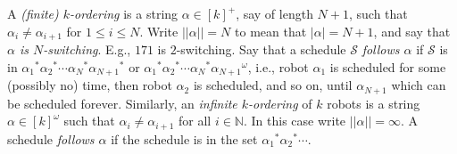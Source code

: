 \documentclass{llncs}
\newcommand{\head}[1]{\vspace{2mm} \noindent  {\bf #1}}
\def\nat{\mathbb{N}}
\def\ins{\textsc{ins}}
\newcommand{\sr}[1]{\footnote{{\color{red} Note. #1}}}
\renewcommand{\sr}[1]{}
\begin{document}

\head{Orderings.} A {\em (finite) $k$-ordering} is a string $\alpha \in [k]^+$, say of length $N+1$, such that $\alpha_i \neq \alpha_{i+1}$ for $1 \leq i \leq N$. Write $||\alpha|| = N$ to mean that $|\alpha| = N+1$, and say that {\em $\alpha$ is $N$-switching}. E.g., $171$ is $2$-switching.
%
Say that a schedule $\mathcal{S}$ {\em follows $\alpha$} if $\mathcal{S}$ is in ${\alpha_1}^* {\alpha_{2}}^* \cdots {\alpha_N}^*{\alpha_{N+1}}^*$ or $ {\alpha_1}^* {\alpha_{2}}^* \cdots {\alpha_N}^*{\alpha_{N+1}}^\omega$, i.e., robot $\alpha_1$ is scheduled for some (possibly no) time, then robot $\alpha_{2}$ is scheduled, and so on, until $\alpha_{N+1}$ which can be scheduled forever.
%
Similarly, an {\em infinite $k$-ordering} of $k$ robots is a string $\alpha \in [k]^\omega$ such that $\alpha_{i} \neq \alpha_{i+1}$ for all $i \in \nat$. In this case write $||\alpha|| = \infty$. A schedule {\em follows $\alpha$} if the schedule is in the set ${\alpha_{1}}^* {\alpha_{2}}^* \cdots$.\sr{do we need this for undecidability proof?}


\end{document}
